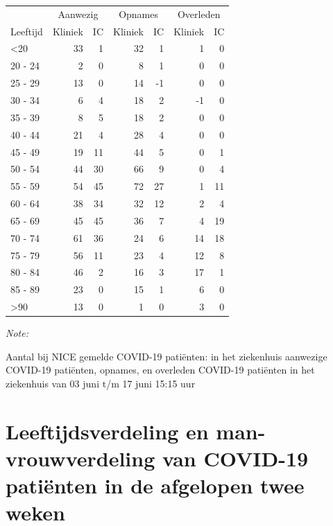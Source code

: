\documentclass[
  english,
  man,floatsintext]{apa6}
\begin{document}
\begin{table}
\centering\begingroup\fontsize{10}{12}\selectfont

\begin{threeparttable}
\begin{tabular}{lrrrrrr}
\toprule
\multicolumn{1}{c}{ } & \multicolumn{2}{c}{Aanwezig} & \multicolumn{2}{c}{Opnames} & \multicolumn{2}{c}{Overleden} \\
\cmidrule(l{3pt}r{3pt}){2-3} \cmidrule(l{3pt}r{3pt}){4-5} \cmidrule(l{3pt}r{3pt}){6-7}
Leeftijd & Kliniek & IC & Kliniek & IC & Kliniek & IC\\
\midrule
<20 & 33 & 1 & 32 & 1 & 1 & 0\\
20 - 24 & 2 & 0 & 8 & 1 & 0 & 0\\
25 - 29 & 13 & 0 & 14 & -1 & 0 & 0\\
30 - 34 & 6 & 4 & 18 & 2 & -1 & 0\\
35 - 39 & 8 & 5 & 18 & 2 & 0 & 0\\
40 - 44 & 21 & 4 & 28 & 4 & 0 & 0\\
45 - 49 & 19 & 11 & 44 & 5 & 0 & 1\\
50 - 54 & 44 & 30 & 66 & 9 & 0 & 4\\
55 - 59 & 54 & 45 & 72 & 27 & 1 & 11\\
60 - 64 & 38 & 34 & 32 & 12 & 2 & 4\\
65 - 69 & 45 & 45 & 36 & 7 & 4 & 19\\
70 - 74 & 61 & 36 & 24 & 6 & 14 & 18\\
75 - 79 & 56 & 11 & 23 & 4 & 12 & 8\\
80 - 84 & 46 & 2 & 16 & 3 & 17 & 1\\
85 - 89 & 23 & 0 & 15 & 1 & 6 & 0\\
>90 & 13 & 0 & 1 & 0 & 3 & 0\\
\bottomrule
\end{tabular}
\begin{tablenotes}
\item \textit{Note: } 
\item Aantal bij NICE gemelde COVID-19 patiënten: in het ziekenhuis aanwezige COVID-19 patiënten, opnames, en overleden COVID-19 patiënten in het ziekenhuis van 03 juni t/m 17 juni 15:15 uur
\end{tablenotes}
\end{threeparttable}
\endgroup{}
\end{table}

\newpage

\hypertarget{leeftijdsverdeling-en-man-vrouwverdeling-van-covid-19-patiuxebnten-in-de-afgelopen-twee-weken}{%
\section{Leeftijdsverdeling en man-vrouwverdeling van COVID-19 patiënten in de afgelopen twee weken}\label{leeftijdsverdeling-en-man-vrouwverdeling-van-covid-19-patiuxebnten-in-de-afgelopen-twee-weken}}
\end{document}
